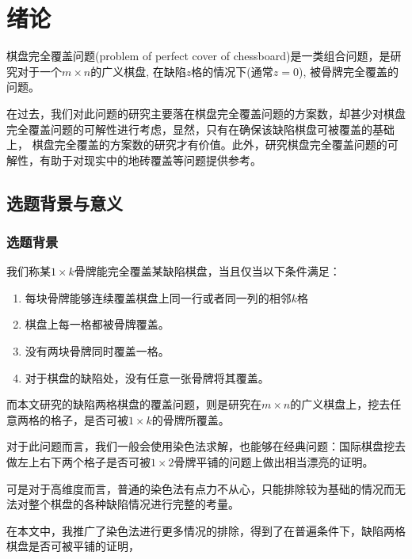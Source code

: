 \chapter{绪论}
棋盘完全覆盖问题(problem of perfect cover of chessboard)是一类组合问题，是研究对于一个$m \times n$的广义棋盘, 在缺陷$z$格的情况下(通常$z=0$), 被骨牌完全覆盖的问题。

在过去，我们对此问题的研究主要落在棋盘完全覆盖问题的方案数，却甚少对棋盘完全覆盖问题的可解性进行考虑，显然，只有在确保该缺陷棋盘可被覆盖的基础上，
棋盘完全覆盖的方案数的研究才有价值。此外，研究棋盘完全覆盖问题的可解性，有助于对现实中的地砖覆盖等问题提供参考。

\section{选题背景与意义}

\subsection{选题背景}
我们称某$1 \times k$骨牌能完全覆盖某缺陷棋盘，当且仅当以下条件满足：
\begin{enumerate}
    \item 每块骨牌能够连续覆盖棋盘上同一行或者同一列的相邻$k$格
    \item 棋盘上每一格都被骨牌覆盖。
    \item 没有两块骨牌同时覆盖一格。
    \item 对于棋盘的缺陷处，没有任意一张骨牌将其覆盖。
\end{enumerate}

而本文研究的缺陷两格棋盘的覆盖问题，则是研究在$m \times n$的广义棋盘上，挖去任意两格的格子，是否可被$1 \times k$的骨牌所覆盖。

对于此问题而言，我们一般会使用染色法求解，也能够在经典问题：国际棋盘挖去做左上右下两个格子是否可被$1 \times 2$骨牌平铺的问题上做出相当漂亮的证明。

可是对于高维度而言，普通的染色法有点力不从心，只能排除较为基础的情况而无法对整个棋盘的各种缺陷情况进行完整的考量。

在本文中，我推广了染色法进行更多情况的排除，得到了在普遍条件下，缺陷两格棋盘是否可被平铺的证明，

